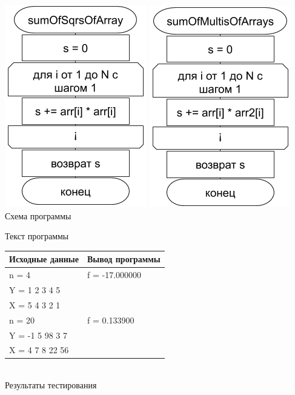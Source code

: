 \documentclass[a4paper,14pt]{extarticle}
\begin{document}
\begin{center}
\includegraphics[scale=0.6]{lab5-2-2.png}
\includegraphics[scale=0.6]{lab5-2-3.png}\\
Схема программы
\end{center}

\begin{center}
Текст программы\\
\vspace{0.6cm}
\begin{tabular}{|l|l|}
\hline
\multicolumn{1}{|c|}{Исходные данные}& \multicolumn{1}{|c|}{Вывод программы}\\
\hline
n = 4 & f = -17.000000 \\
Y = 1 2 3 4 5 & \\
X = 5 4 3 2 1 & \\
\hline
n = 20 & f = 0.133900 \\
Y = -1 5 98 3 7 & \\
X = 4 7 8 22 56 & \\
\hline
\end{tabular}\\
\vspace{0.3cm}
Результаты тестирования
\end{center}
\end{document}
